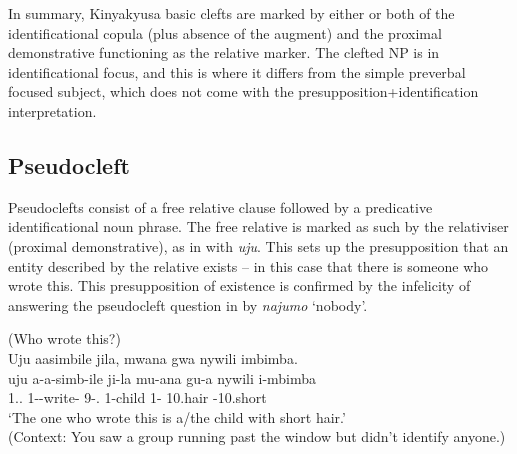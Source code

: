 \documentclass[output=paper]{langscibook}
\begin{document}
In summary, Kinyakyusa basic clefts are marked by either or both of the identificational copula (plus absence of the augment) and the proximal demonstrative functioning as the relative marker. The clefted NP is in identificational focus, and this is where it differs from the simple preverbal focused subject, which does not come with the presupposition+identification interpretation.

\subsection{Pseudocleft}
\label{bkm:Ref122533667}
Pseudoclefts consist of a free relative clause followed by a predicative identificational noun phrase. The free relative is marked as such by the relativiser (proximal demonstrative), as in  with \textit{uju}. This sets up the presupposition that an entity described by the relative exists – in this case that there is someone who wrote this. This presupposition of existence is confirmed by the infelicity of answering the pseudocleft question in  by \textit{najumo} ‘nobody’.\largerpage[2]

\ea
\label{bkm:Ref98083691}
(Who wrote this?)\\
Uju aasimbile jila, mwana gwa nywili imbimba.\\
\gll
uju  a-a-simb-ile  ji-la  mu-ana  gu-a  nywili  i-mbimba\\
1.\DEM.\PROX{}  1\SM-\PST{}-write-\PFV{}  9-\DEM.\DIST{}  1-child  1-\CONN{}  10.hair  \AUG{}-10.short\\
\glt
‘The one who wrote this is a/the child with short hair.’\\

\ex
\label{bkm:Ref98083949}
(Context: You saw a group running past the window but didn’t identify anyone.)\\
\begin{xlist}

\end{xlist}
\z
\end{document}
